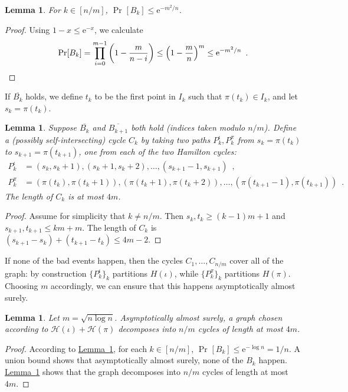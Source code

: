 \documentclass[11pt]{article}
\numberwithin{equation}{section}
\newtheorem{lemma}[theorem]{Lemma}
\theoremstyle{definition}
\theoremstyle{plain}
\newcommand{\eee}{\mathrm e}
\newcommand{\expref}[2]{\hyperref[#2]{#1~\ref{#2}}}
\theoremstyle{plain}
\theoremstyle{definition}
\newcommand{\prob}[2][]{\Pr_{#1} [ #2 ]}
\newcommand{\set}[1]{\{ #1 \}}
\newcommand{\eqperiod}{\enspace .}
\newcommand{\eqcomma}{\enspace ,}
\newcommand{\probspace}{\mathcal}
\newcommand{\psHam}{\probspace{H}}
\begin{document}
\begin{lemma} \label{lem:b-prob}
 For $k \in [n/m]$, $\prob{B_k} \leq \eee^{-m^2/n}$.
\end{lemma}
\begin{proof}
 Using $1-x \leq \eee^{-x}$, we calculate
\begin{equation}
 \prob{B_k} = \prod_{i=0}^{m-1} \left(1 - \frac{m}{n-i}\right) \leq \left(1 - \frac{m}{n}\right)^m \leq \eee^{-m^2/n} \eqperiod \qedhere
\end{equation}
\end{proof}

If $\overline{B_k}$ holds, we define $t_k$ to be the first point in $I_k$ such that $\pi(t_k) \in I_k$, and let $s_k = \pi(t_k)$.

\begin{lemma} \label{lem:cycle}
 Suppose $\overline{B_k}$ and $\overline{B_{k+1}}$ both hold (indices taken modulo $n/m$). Define a (possibly self-intersecting) cycle $C_k$ by taking two paths $P_k^\iota,P_k^\pi$ from $s_k = \pi(t_k)$ to $s_{k+1} = \pi(t_{k+1})$, one from each of the two Hamilton cycles:
\begin{align*}
 P_k^\iota &= (s_k,s_k+1),(s_k+1,s_k+2),\ldots,(s_{k+1}-1,s_{k+1}) \eqcomma \\
 P_k^\pi &= (\pi(t_k),\pi(t_k+1)),(\pi(t_k+1),\pi(t_k+2)),\ldots,(\pi(t_{k+1}-1),\pi(t_{k+1})) \eqperiod
\end{align*}
 The length of $C_k$ is at most $4m$.
\end{lemma}
\begin{proof}
 Assume for simplicity that $k \neq n/m$. Then $s_k,t_k \geq (k-1)m + 1$ and $s_{k+1},t_{k+1} \leq km + m$. The length of $C_k$ is $(s_{k+1} - s_k) + (t_{k+1} - t_k) \leq 4m-2$.
\end{proof}

If none of the bad events happen, then the cycles $C_1,\ldots,C_{n/m}$ cover all of the graph: by construction $\set{P_k^\iota}_k$ partitions $H(\iota)$, while $\set{P_k^\pi}_k$ partitions $H(\pi)$. Choosing $m$ accordingly, we can ensure that this happens asymptotically almost surely.

\begin{lemma} \label{lem:partition}
 Let $m = \sqrt{n\log n}$. Asymptotically almost surely, a graph chosen according to $\psHam(\iota) + \psHam(\pi)$ decomposes into $n/m$ cycles of %
 length at most $4m$.
\end{lemma}
\begin{proof}
 According to \expref{Lemma}{lem:b-prob}, for each $k \in [n/m]$, $\prob{B_k} \leq \eee^{-\log n} = 1/n$. A union bound shows that asymptotically almost surely, none of the $B_k$ happen. \expref{Lemma}{lem:cycle} shows that the graph decomposes into $n/m$ cycles of %
 length at most $4m$.
\end{proof}
\end{document}
